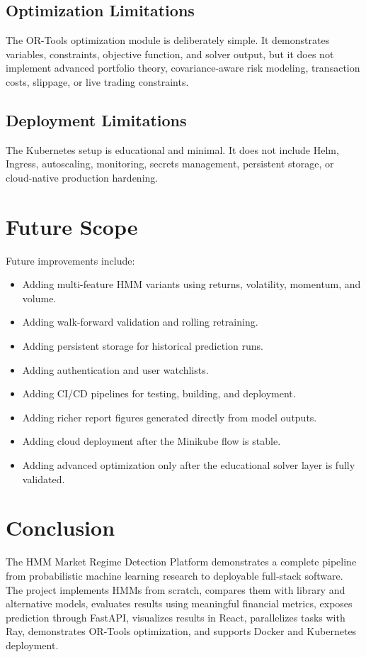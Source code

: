 \documentclass[12pt,a4paper]{report}
\begin{document}
\section{Optimization Limitations}
The OR-Tools optimization module is deliberately simple. It demonstrates variables, constraints, objective function, and solver output, but it does not implement advanced portfolio theory, covariance-aware risk modeling, transaction costs, slippage, or live trading constraints.

\section{Deployment Limitations}
The Kubernetes setup is educational and minimal. It does not include Helm, Ingress, autoscaling, monitoring, secrets management, persistent storage, or cloud-native production hardening.

\chapter{Future Scope}
Future improvements include:
\begin{itemize}
    \item Adding multi-feature HMM variants using returns, volatility, momentum, and volume.
    \item Adding walk-forward validation and rolling retraining.
    \item Adding persistent storage for historical prediction runs.
    \item Adding authentication and user watchlists.
    \item Adding CI/CD pipelines for testing, building, and deployment.
    \item Adding richer report figures generated directly from model outputs.
    \item Adding cloud deployment after the Minikube flow is stable.
    \item Adding advanced optimization only after the educational solver layer is fully validated.
\end{itemize}

\chapter{Conclusion}
The HMM Market Regime Detection Platform demonstrates a complete pipeline from probabilistic machine learning research to deployable full-stack software. The project implements HMMs from scratch, compares them with library and alternative models, evaluates results using meaningful financial metrics, exposes prediction through FastAPI, visualizes results in React, parallelizes tasks with Ray, demonstrates OR-Tools optimization, and supports Docker and Kubernetes deployment.
\end{document}

